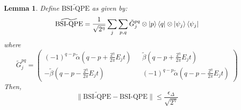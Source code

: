 \documentclass[aps,floatfix,10pt,amssymb,amsfont,amsmath,superscriptaddress,float,nofootinbib,longbibliography,nobalancelastpage,twocolumn]{revtex4-2}
\newtheorem{lemma}{Lemma}
\begin{document}
\begin{lemma}
\label{lemma:0}
    Define $\widetilde{\text{BSI-QPE}}$ as given by:
    \begin{equation}
       \widetilde{\text{BSI-QPE}}= \frac{1}{\sqrt{2^{\eta}}}\sum_j \sum_{p,q} \tilde G^{pq}_j \otimes \ket{p}\bra{q} \otimes \ket{\psi_j}\bra{\psi_j}
    \end{equation}
    where 
    \begin{equation}
        \tilde G^{pq}_j = \begin{pmatrix}
        (-1)^{q-p}\tilde\alpha(q-p+\frac{2^{\eta}}{2\pi}E_jt) && \tilde\beta(q-p+\frac{2^{\eta}}{2\pi}E_jt)\\
        -\tilde\beta (q-p-\frac{2^{\eta}}{2\pi}E_jt) && (-1)^{q-p}\tilde\alpha(q-p-\frac{2^{\eta}}{2\pi}E_jt)
    \end{pmatrix}
    \end{equation}
    Then,  
    \begin{equation}
        \|\widetilde{\text{BSI-QPE}}-\text{BSI-QPE}\| \leq \frac{\epsilon_{\Delta}}{\sqrt{2^{\eta}}}
    \end{equation}
\end{lemma}
\end{document}
